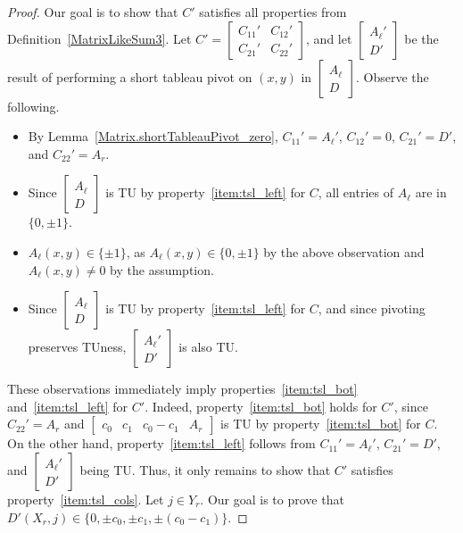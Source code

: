 \begin{proof}
    Our goal is to show that $C'$ satisfies all properties from Definition~\ref{MatrixLikeSum3}. Let $C' = \begin{bmatrix} C_{11}' & C_{12}' \\ C_{21}' & C_{22}' \end{bmatrix}$, and let $\begin{bmatrix} A_{\ell}' \\ D' \end{bmatrix}$ be the result of performing a short tableau pivot on $(x, y)$ in $\begin{bmatrix} A_{\ell} \\ D \end{bmatrix}$. Observe the following.

    \begin{itemize}
        \item By Lemma~\ref{Matrix.shortTableauPivot_zero}, $C_{11}' = A_{\ell}'$, $C_{12}' = 0$, $C_{21}' = D'$, and $C_{22}' = A_{r}$.
        \item Since $\begin{bmatrix} A_{\ell} \\ D \end{bmatrix}$ is TU by property~\ref{item:tsl_left} for $C$, all entries of $A_{\ell}$ are in $\{0, \pm 1\}$.
        \item $A_{\ell} (x, y) \in \{\pm 1\}$, as $A_{\ell} (x, y) \in \{0, \pm 1\}$ by the above observation and $A_{\ell} (x, y) \neq 0$ by the assumption.
        \item Since $\begin{bmatrix} A_{\ell} \\ D \end{bmatrix}$ is TU by property~\ref{item:tsl_left} for $C$, and since pivoting preserves TUness, $\begin{bmatrix} A_{\ell}' \\ D' \end{bmatrix}$ is also TU.
    \end{itemize}

    These observations immediately imply properties~\ref{item:tsl_bot} and~\ref{item:tsl_left} for $C'$. Indeed, property~\ref{item:tsl_bot} holds for $C'$, since $C_{22}' = A_{r}$ and $\begin{bmatrix} c_{0} & c_{1} & c_{0} - c_{1} & A_{r} \end{bmatrix}$ is TU by property~\ref{item:tsl_bot} for $C$. On the other hand, property~\ref{item:tsl_left} follows from $C_{11}' = A_{\ell}'$, $C_{21}' = D'$, and $\begin{bmatrix} A_{\ell}' \\ D' \end{bmatrix}$ being TU. Thus, it only remains to show that $C'$ satisfies property~\ref{item:tsl_cols}. Let $j \in Y_{r}$. Our goal is to prove that $D' (X_{r}, j) \in \{0, \pm c_{0}, \pm c_{1}, \pm (c_{0} - c_{1})\}$.


\end{proof}
